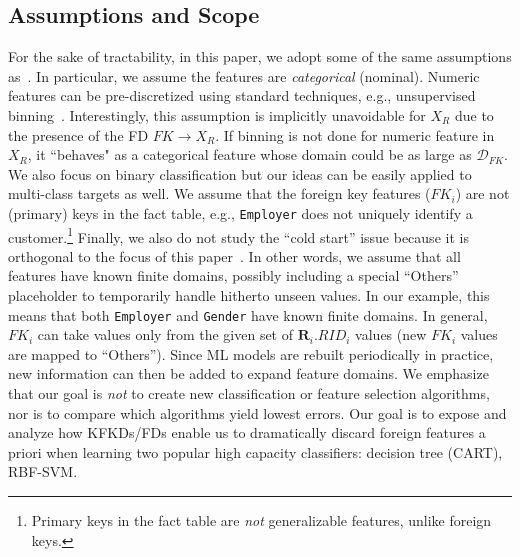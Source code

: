 \documentclass{vldb}
\newcommand{\eat}[1]{}
\begin{document}
\eat{
\paragraph*{Example}
Consider a common classification task for which ML classifiers are used, predicting \textit{customer churn}.
The fact table is \texttt{Customers} (\underline{\texttt{CustomerID}}, \texttt{Churn}, \texttt{Gender}, \texttt{Age}, \texttt{Employer}, \texttt{ZipCode}).
\texttt{Employer} and \texttt{Zipcode} are foreign key features that refer respectively to a customer's employer (e.g., Google or Microsoft) and the area 
where a customer lives. The respective dimension tables are \texttt{Employers} (\underline{\texttt{Employer}}, \texttt{State}, \texttt{Revenue}) 
and \texttt{Areas} (\underline{ZipCode}, \texttt{CrimeRate}, \texttt{AccidentRate}).
In such scenarios, data scientists typically join all base tables to bring in the extra features from the dimension tables. In this case, they might do so 
because of a hunch that customers employed by rich corporations in coastal states and living in ``safe'' areas are unlikely to churn.
}

\subsection{Assumptions and Scope}
For the sake of tractability, in this paper, we adopt some of the same assumptions as~\cite{hamlet}. In particular, we assume the features are 
\textit{categorical} (nominal). Numeric features can be pre-discretized using standard techniques, e.g., unsupervised binning~\cite{mitchellbook}. 
Interestingly, this assumption is implicitly unavoidable for $X_R$ due to the presence of the FD $FK \rightarrow X_R$. If binning is not done for 
numeric feature in $X_R$, it ``behaves" as a categorical feature whose domain could be as large as $\mathcal{D}_{FK}$.
We also focus on binary classification but our ideas can be easily applied to 
multi-class targets as well. We assume that the foreign key features ($FK_i$) are not (primary) keys in the fact table, e.g., \texttt{Employer} does 
not uniquely identify a customer.\footnote{Primary keys in the fact table are \textit{not} generalizable features, unlike foreign keys.}
Finally, we also do not study the ``cold start'' issue because it is orthogonal to the focus of this paper~\cite{coldstart}. In other words, we assume that all features 
have known finite domains, possibly including a special ``Others'' placeholder to temporarily handle hitherto unseen values. In our example, this means that both 
\texttt{Employer} and \texttt{Gender} have known finite domains. In general, $FK_i$ can take values only from the given set of $\textbf{R}_i.RID_i$ values 
(new $FK_i$ values are mapped to ``Others''). Since ML models are rebuilt periodically in practice, new information can then be added to expand feature domains. 
We emphasize that our goal is \textit{not} to create new classification or feature selection algorithms, nor is to compare which algorithms yield lowest errors.
Our goal is to expose and analyze how KFKDs/FDs enable us to dramatically discard foreign features a priori when learning two popular high capacity 
classifiers: decision tree (CART), RBF-SVM.
\end{document}
